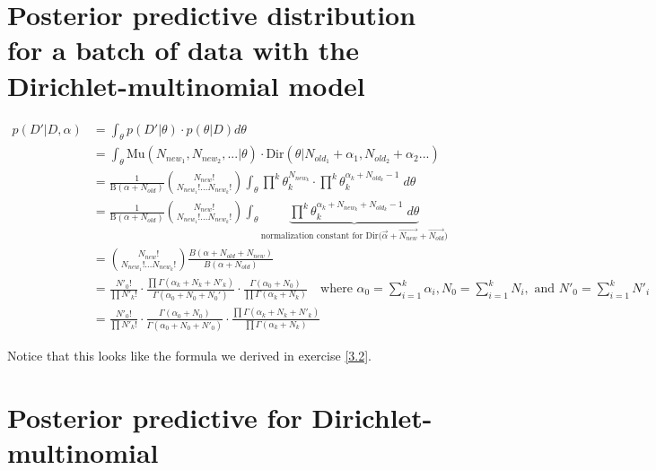 \documentclass{article}
\begin{document}
\section{Posterior predictive distribution for a batch of data with
the Dirichlet-multinomial model}
\label{3.13}

\begin{align*}
  p(D'|D,\alpha) &= \int_\theta p(D'|\theta) \cdot p(\theta|D) d\theta
  \\
                 &= \int_\theta \text{Mu}(N_{new_1}, N_{new_2},...|\theta) \cdot
                   \text{Dir}(\theta|N_{old_1} + \alpha_1, N_{old_2} + \alpha_2 ...)
  \\
                 &= \frac{1}{\text{B}(\alpha + N_{old})} {N_{new}!
                   \choose N_{new_1}! ... N_{new_k}!} \int_{\theta}
                   \prod^k \theta_k^{N_{new_k}} \cdot \prod^k
                   \theta_k^{\alpha_k + N_{old_k}
                   - 1} \; d\theta \\
                 &= \frac{1}{\text{B}(\alpha + N_{old})} {N_{new}!
                   \choose N_{new_1}! ... N_{new_k}!} \int_{\theta} \underbrace{
                   \prod^k \theta_k^{\alpha_k + N_{new_k} + N_{old_k}
                   - 1} \; d\theta}_{\text{normalization constant for
                   Dir($\vec{\alpha} + \vec{N_{new}} +
                   \vec{N_{old}}$)}} \\
                 &= {N_{new}! \choose N_{new_1}! ... N_{new_k}!}
                   \frac{B(\alpha + N_{old} + N_{new})}{B(\alpha +
                   N_{old})} \\
                 &= \frac{N'_0!}{\prod N'_k!} \cdot \frac{\prod
                   \Gamma(\alpha_k + N_k + N'_k)}{\Gamma(\alpha_0 + N_0
                   + N_0')} \cdot \frac{\Gamma(\alpha_0 + N_0)}{\prod
                   \Gamma(\alpha_k + N_k)} \quad \text{where
                   $\alpha_0 = \sum_{i=1}^k \alpha_i, N_0 = \sum_{i=1}^k
                   N_i, \text{ and } N'_0 = \sum_{i=1}^k N'_i$} \\
                 &= \frac{N'_0!}{\prod N'_k!} \cdot \frac{\Gamma(\alpha_0 +
                   N_0)}{\Gamma(\alpha_0 + N_0 + N'_0)} \cdot
                   \frac{\prod \Gamma(\alpha_k + N_k + N'_k)}{\prod
                   \Gamma(\alpha_k + N_k)}
\end{align*}

Notice that this looks like the formula we derived in exercise
\ref{3.2}.

\section{Posterior predictive for Dirichlet-multinomial}
\end{document}
